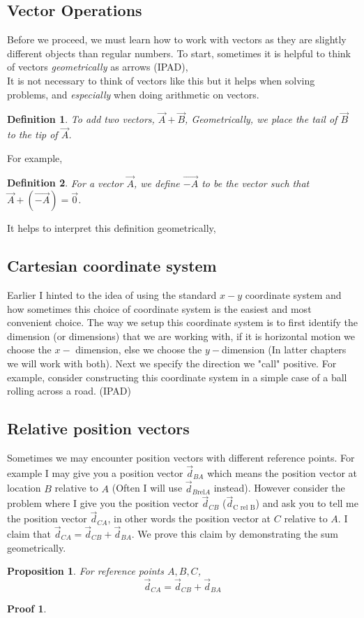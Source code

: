 \documentclass[12pt]{article}
\newcommand{\tx}[1]{\text{#1}}
\theoremstyle{break}
\newtheorem*{pf}{Proof}
\newtheorem{defn}{Definition}[subsection]
\newtheorem{prop}[thm]{Proposition}
\begin{document}
\subsection{Vector Operations}
Before we proceed, we must learn how to work with vectors as they are slightly different objects than regular
numbers. To start, sometimes it is helpful to think of vectors \emph{geometrically}  as arrows (IPAD),
\vspace*{1cm}\\
It is not necessary to think of vectors like this but it helps when solving problems, and \emph{especially}
when doing arithmetic on vectors.
\begin{defn}
    To add two vectors, $\vec A + \vec B$, \emph{Geometrically}, we place the \emph{tail} of $\vec B$ to the
    \emph{tip} of $\vec A$.
\end{defn}

For example,
\vspace*{5cm}
\begin{defn}
    For a vector $\vec A$, we define $\overrightarrow {-A}$ to be the vector such that $\vec A +
    (\overrightarrow{-A}) = \vec 0$.
\end{defn}
It helps to interpret this definition geometrically,

\newpage 
\subsection{Cartesian coordinate system}
Earlier I hinted to the idea of using the standard $x-y$ coordinate system and how sometimes this choice of coordinate system is the easiest and most convenient choice. The way we setup this coordinate system is to first identify the dimension (or dimensions) that we are working with, if it is horizontal motion we choose the $x-$ dimension, else we choose the $y-$dimension (In latter chapters we will work with both). Next we specify the direction we "call" positive. For example, consider constructing this coordinate system in a simple case of a ball rolling across a road. (IPAD)
\vspace*{5cm}

\subsection{Relative position vectors}
Sometimes we may encounter position vectors with different reference points. For example I may give you a position vector $\vec d_{BA}$ which means the position vector at location $B$ relative to $A$ (Often I will use $\vec d_{B \tx{rel} A}$ instead). However consider the problem where I give you the position vector $\vec d_{CB}$ ($\vec d_{\tx{C rel B}}$) and ask you to tell me the position vector $\vec d_{CA}$, in other words the position vector at $C$ relative to $A$. I claim that $\vec d_{CA} = \vec d_{CB} + \vec d_{BA}$. We prove this claim by demonstrating the sum geometrically.
\begin{prop}
   For reference points $A,B,C$, $$\vec d_{CA} = \vec d_{CB} + \vec d_{BA}$$ 
\end{prop}
\begin{pf}
    
\end{pf}
\end{document}
